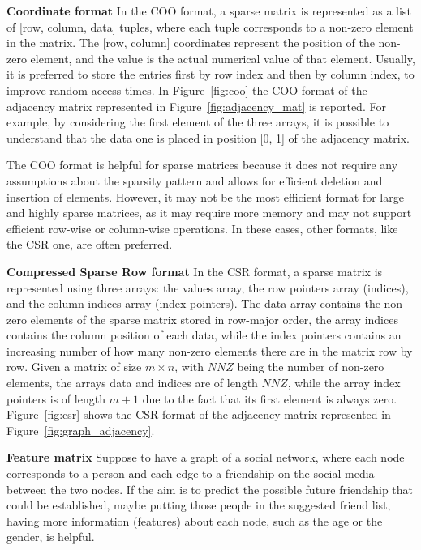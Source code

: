 \textbf{Coordinate format} \newline
In the COO format, a sparse matrix is represented as a list of [row, column, data] tuples, where each tuple corresponds to a non-zero element in the matrix.
The [row, column] coordinates represent the position of the non-zero element, and the value is the actual numerical value of that element.
Usually, it is preferred to store the entries first by row index and then by column index, to improve random access times.
In Figure~\ref{fig:coo} the COO format of the adjacency matrix represented in Figure~\ref{fig:adjacency_mat} is reported.
For example, by considering the first element of the three arrays, it is possible to understand that the data one is placed in position [0, 1] of the adjacency matrix.

The COO format is helpful for sparse matrices because it does not require any assumptions about the sparsity pattern and allows for efficient deletion and insertion of elements.
However, it may not be the most efficient format for large and highly sparse matrices, as it may require more memory and may not support efficient row-wise or column-wise operations.
In these cases, other formats, like the CSR one, are often preferred.

\textbf{Compressed Sparse Row format} \newline
In the CSR format, a sparse matrix is represented using three arrays: the values array, the row pointers array (indices), and the column indices array (index pointers).
The data array contains the non-zero elements of the sparse matrix stored in row-major order, the array indices contains the column position of each data, while the index pointers
contains an increasing number of how many non-zero elements there are in the matrix row by row.
Given a matrix of size $m \times n$, with $NNZ$ being the number of non-zero elements, the arrays data and indices are of length $NNZ$, while the array index pointers is of length $m+1$ due to the fact that its first element is always zero.
Figure~\ref{fig:csr} shows the CSR format of the adjacency matrix represented in Figure~\ref{fig:graph_adjacency}.

\textbf{Feature matrix} \newline
Suppose to have a graph of a social network, where each node corresponds to a person and each edge to a friendship on the social media between the two nodes.
If the aim is to predict the possible future friendship that could be established, maybe putting those people in the suggested friend list, having more information (features) about each node, such as the age or the gender, is helpful.

